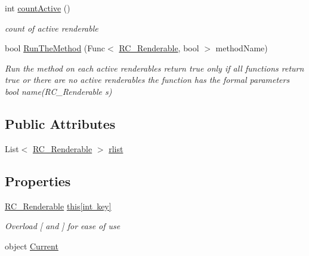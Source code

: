 \begin{DoxyCompactItemize}
int \mbox{\hyperlink{class_r_c___framework_1_1_r_c___renderable_list_a5743c82009f4d250d03bdbf1ee32bdcc}{count\+Active}} ()
\begin{DoxyCompactList}\small\item\em count of active renderable \end{DoxyCompactList}\item 
bool \mbox{\hyperlink{class_r_c___framework_1_1_r_c___renderable_list_a65b0bbae9d1d83579d269d756a3626e3}{Run\+The\+Method}} (Func$<$ \mbox{\hyperlink{class_r_c___framework_1_1_r_c___renderable}{R\+C\+\_\+\+Renderable}}, bool $>$ method\+Name)
\begin{DoxyCompactList}\small\item\em Run the method on each active renderables return true only if all functions return true or there are no active renderables the function has the formal parameters bool name(\+R\+C\+\_\+\+Renderable s) \end{DoxyCompactList}\end{DoxyCompactItemize}
\subsection*{Public Attributes}
\begin{DoxyCompactItemize}
\item 
List$<$ \mbox{\hyperlink{class_r_c___framework_1_1_r_c___renderable}{R\+C\+\_\+\+Renderable}} $>$ \mbox{\hyperlink{class_r_c___framework_1_1_r_c___renderable_list_ab54b7af85213b25a5d66cd169c27b352}{rlist}}
\end{DoxyCompactItemize}
\subsection*{Properties}
\begin{DoxyCompactItemize}
\item 
\mbox{\hyperlink{class_r_c___framework_1_1_r_c___renderable}{R\+C\+\_\+\+Renderable}} \mbox{\hyperlink{class_r_c___framework_1_1_r_c___renderable_list_a8a63966970b03403ce48e9bcca4f795d}{this\mbox{[}int key\mbox{]}}}
\begin{DoxyCompactList}\small\item\em Overload \mbox{[} and \mbox{]} for ease of use \end{DoxyCompactList}\item 
object \mbox{\hyperlink{class_r_c___framework_1_1_r_c___renderable_list_ad9d22dbadf2d32491b2bfad15acb37dd}{Current}}
\end{DoxyCompactItemize}


